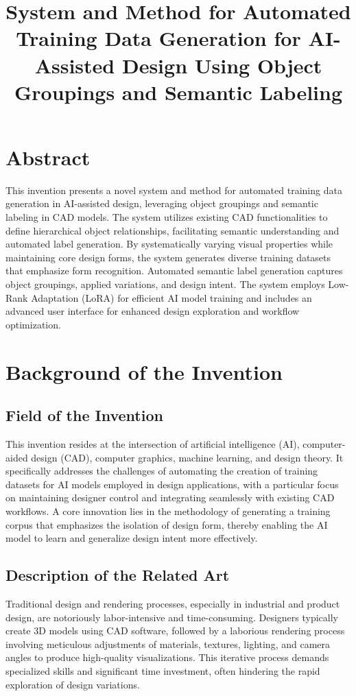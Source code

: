 \documentclass{article}
\title{System and Method for Automated Training Data Generation for AI-Assisted Design Using Object Groupings and Semantic Labeling}
\begin{document}
\section{Abstract}

This invention presents a novel system and method for automated training data generation in AI-assisted design, leveraging object groupings and semantic labeling in CAD models. The system utilizes existing CAD functionalities to define hierarchical object relationships, facilitating semantic understanding and automated label generation. By systematically varying visual properties while maintaining core design forms, the system generates diverse training datasets that emphasize form recognition. Automated semantic label generation captures object groupings, applied variations, and design intent. The system employs Low-Rank Adaptation (LoRA) for efficient AI model training and includes an advanced user interface for enhanced design exploration and workflow optimization.

\section{Background of the Invention}

\subsection{Field of the Invention}

This invention resides at the intersection of artificial intelligence (AI), computer-aided design (CAD), computer graphics, machine learning, and design theory. It specifically addresses the challenges of automating the creation of training datasets for AI models employed in design applications, with a particular focus on maintaining designer control and integrating seamlessly with existing CAD workflows. A core innovation lies in the methodology of generating a training corpus that emphasizes the isolation of design form, thereby enabling the AI model to learn and generalize design intent more effectively.



\subsection{Description of the Related Art}

Traditional design and rendering processes, especially in industrial and product design, are notoriously labor-intensive and time-consuming. Designers typically create 3D models using CAD software, followed by a laborious rendering process involving meticulous adjustments of materials, textures, lighting, and camera angles to produce high-quality visualizations. This iterative process demands specialized skills and significant time investment, often hindering the rapid exploration of design variations.
\end{document}
